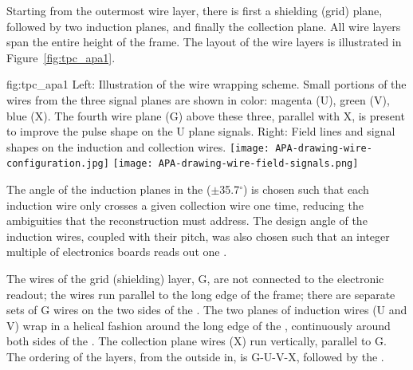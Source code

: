 Starting from the outermost wire layer, 
there is first a shielding (grid) plane, followed by two induction planes, and finally the collection plane. All wire layers span the entire height of the  frame. The layout of the wire layers is illustrated in  Figure~\ref{fig:tpc_apa1}.

\begin{dunefigure}{fig:tpc_apa1}
{Left: Illustration of the  wire wrapping scheme. Small portions of the wires from the three signal planes are shown in color: magenta (U), green (V), blue (X). The fourth wire plane (G) above these three, parallel with X, is present to improve the pulse shape on the U plane signals.  Right: Field lines and signal shapes on the induction and collection wires. 
}
\texttt{[image: APA-drawing-wire-configuration.jpg]} 
\texttt{[image: APA-drawing-wire-field-signals.png]} 
\end{dunefigure}

The angle of the induction planes in the   ($\pm$35.7$^{\circ}$) is chosen such that each induction wire only crosses a given collection wire one time, reducing the ambiguities that the reconstruction must address.  The design angle of the induction wires, coupled with their pitch, was also chosen such that an integer multiple of electronics boards reads out one  .

The wires of the grid (shielding) layer, G,  are not connected to the electronic readout; the wires run parallel to the long edge of the   frame; there are separate sets of G wires on the two sides of the  . 
 The two planes of induction wires (U and V) wrap in a helical fashion around the long edge of the  , continuously around both sides of the  .  The collection plane wires (X) run vertically, parallel to G.   The ordering of the layers, from the outside in, is G-U-V-X, followed by the .   

